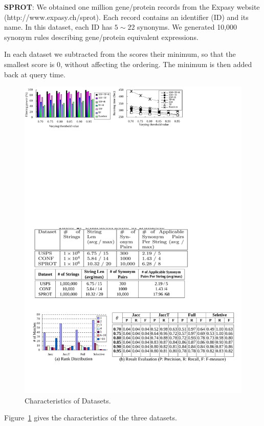 \noindent \textbf{{SPROT}}: We obtained one million gene/protein records
from the Expasy website ({\footnotesize http://www.expasy.ch/sprot}).
Each record contains an identifier (ID) and its name.
In this dataset, each ID has $5\sim22$ synonyms. We generated 10,000 synonym rules describing gene/protein
equivalent expressions.

In each dataset we subtracted from the scores their minimum,
so that the smallest score is 0, without affecting the
ordering. The minimum is then added back at query time.




\begin{figure}
  \small
  \centering
  \includegraphics[width=\linewidth]{figures/Characteristics_Datasets}
   \vspace{-6mm}
  \caption{Characteristics of Datasets.}
  \label{tab:data_characteristics}
\end{figure}


Figure~\ref{tab:data_characteristics} gives the characteristics of the
three datasets.
